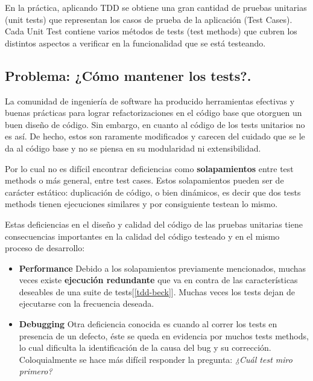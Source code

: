 \par En la práctica, aplicando TDD se obtiene una gran cantidad de pruebas unitarias (unit tests) que representan los casos de prueba de la aplicación (Test Cases). Cada Unit Test contiene varios métodos de tests (test methods) que cubren los distintos aspectos a verificar en la funcionalidad que se está testeando.

\subsection{Problema: ¿Cómo mantener los tests?.}

\par La comunidad de ingeniería de software ha producido herramientas efectivas y buenas prácticas para lograr refactorizaciones en el código base que otorguen un buen diseño de código. Sin embargo, en cuanto al código de los tests unitarios no es así. De hecho, estos son raramente modificados y carecen del cuidado que se le da al código base y no se piensa en su modularidad ni extensibilidad. 

\par Por lo cual no es difícil encontrar deficiencias como \textbf{solapamientos} entre test methods o más general, entre test cases. Estos solapamientos pueden ser de carácter estático: duplicación de código, o bien dinámicos, es decir que dos tests methods tienen ejecuciones similares y por consiguiente testean lo mismo. 
\par Estas deficiencias en el diseño y calidad del código de las pruebas unitarias tiene consecuencias importantes en la calidad del código testeado y en el mismo proceso de desarrollo:
\begin{itemize}
\item \textbf{Performance} Debido a los solapamientos previamente mencionados, muchas veces existe \textbf{ejecución redundante} que va en contra de las características deseables de una suite de tests[\ref{tdd-beck}]. Muchas veces los tests dejan de ejecutarse con la frecuencia deseada.
\item \textbf{Debugging} Otra deficiencia conocida es cuando al correr los tests en presencia de un defecto, éste se queda en evidencia por muchos tests methods, lo cual dificulta la identificación de la causa del bug y su corrección. Coloquialmente se hace más difícil responder la pregunta: \emph{¿Cuál test miro primero?}
\end{itemize}
 
